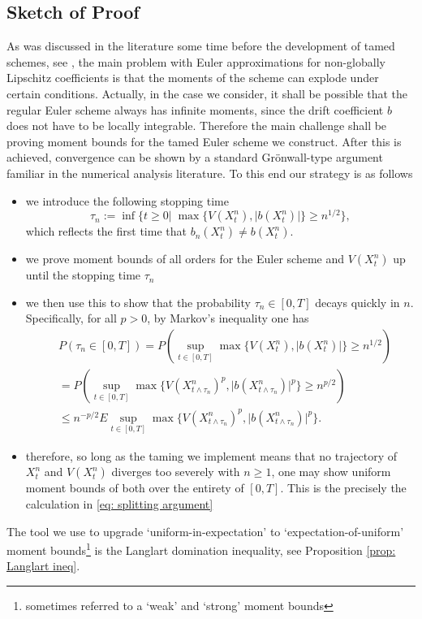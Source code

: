 \documentclass{article}
\begin{document}
\subsection{Sketch of Proof}
As was discussed in the literature some time before the development of tamed schemes, see \cite{0b5e028f-1a33-3fed-ae08-229fd5443c3f, MATTINGLY2002185}, the main problem with Euler approximations for non-globally Lipschitz coefficients is that the moments of the scheme can explode under certain conditions. Actually, in the case we consider, it shall be possible that the regular Euler scheme always has infinite moments, since the drift coefficient $b$ does not have to be locally integrable. Therefore the main challenge shall be proving moment bounds for the tamed Euler scheme we construct. After this is achieved, convergence can be shown by a standard Grönwall-type argument familiar in the numerical analysis literature. To this end our strategy is as follows
\begin{itemize}
    \item we introduce the following stopping time
 \begin{equation}\label{eq: tau_n defn}
        \tau_n:=\inf\{t\geq 0\vert \;\max\{V(X^n_t), \lvert b(X^n_t)\rvert\}\geq n^{1/2}\},
    \end{equation}
    which reflects the first time that $b_n(X^n_t)\not=b(X^n_t)$.
    \item we prove moment bounds of all orders for the Euler scheme and $V(X^n_t)$ up until the stopping time $\tau_n$
    \item we then use this to show that the probability $\tau_n\in [0,T]$ decays quickly in $n$. Specifically, for all $p>0$, by Markov's inequality one has
    \begin{align}
        &P(\tau_n\in [0,T])=P(\sup_{t\in [0,T]} \max\{V(X^n_t), \lvert b(X^n_t)\rvert\}\geq n^{1/2})\nonumber \\
        &=P(\sup_{t\in [0,T]} \max\{V(X^n_{t\wedge \tau_n})^p, \lvert b(X^n_{t\wedge \tau_n})\rvert^p\}\geq n^{p/2})\nonumber \\
&\leq n^{-p/2}E\sup_{t\in [0,T]} \max\{V(X^n_{t\wedge \tau_n})^p, \lvert b(X^n_{t\wedge \tau_n})\rvert^p\}.
    \end{align}
    \item therefore, so long as the taming we implement means that no trajectory of $X^n_t$ and $V(X^n_t)$ diverges too severely with $n\geq 1$, one may show uniform moment bounds of both over the entirety of $[0,T]$. This is the precisely the calculation in \eqref{eq: splitting argument}
\end{itemize}
The tool we use to upgrade `uniform-in-expectation' to `expectation-of-uniform' moment bounds\footnote{sometimes referred to a `weak' and `strong' moment bounds} is the Langlart domination inequality, see Proposition \ref{prop: Langlart ineq}.
\end{document}
